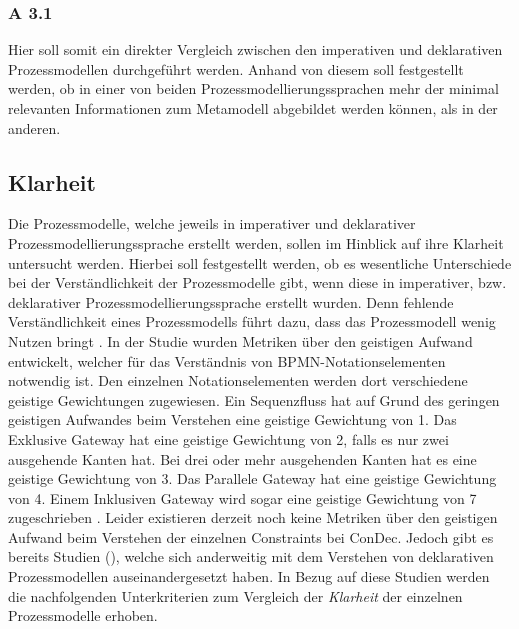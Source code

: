 \subsubsection{A 3.1}

Hier soll somit ein direkter Vergleich zwischen den imperativen und deklarativen Prozessmodellen durchgeführt werden. Anhand von diesem soll festgestellt werden, ob in einer von beiden Prozessmodellierungssprachen mehr der minimal relevanten Informationen zum Metamodell abgebildet werden können, als in der anderen.\newline

\subsection{Klarheit}


Die Prozessmodelle, welche jeweils in imperativer und deklarativer Prozessmodellierungssprache erstellt werden, sollen im Hinblick auf ihre Klarheit untersucht werden. Hierbei soll festgestellt werden, ob es wesentliche Unterschiede bei der Verständlichkeit der Prozessmodelle gibt, wenn diese in imperativer, bzw. deklarativer Prozessmodellierungssprache erstellt wurden. Denn fehlende Verständlichkeit eines Prozessmodells führt dazu, dass das Prozessmodell wenig Nutzen bringt \cite{journals95, freund2007,reinshagen2009}. \newline
In der Studie \cite{gruhn2006adopting} wurden Metriken über den geistigen Aufwand entwickelt, welcher für das Verständnis von BPMN-Notationselementen notwendig ist. Den einzelnen Notationselementen werden dort verschiedene geistige Gewichtungen zugewiesen. Ein Sequenzfluss hat auf Grund des geringen geistigen Aufwandes beim Verstehen eine geistige Gewichtung von 1. Das Exklusive Gateway hat eine geistige Gewichtung von 2, falls es nur zwei ausgehende Kanten hat. Bei drei oder mehr ausgehenden Kanten hat es eine geistige Gewichtung von 3. Das Parallele Gateway hat eine geistige Gewichtung von 4. Einem Inklusiven Gateway wird sogar eine geistige Gewichtung von 7 zugeschrieben \cite{gruhn2006adopting}.\newline
Leider existieren derzeit noch keine Metriken über den geistigen Aufwand beim Verstehen der einzelnen Constraints bei ConDec. Jedoch gibt es bereits Studien (\cite{thesis_maja,haisjackl2014understanding}), welche sich anderweitig mit dem Verstehen von deklarativen Prozessmodellen auseinandergesetzt haben. In Bezug auf diese Studien werden die nachfolgenden Unterkriterien zum Vergleich der \textit{Klarheit} der einzelnen Prozessmodelle erhoben.


